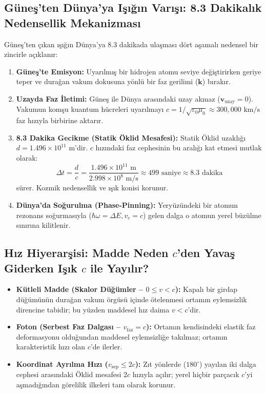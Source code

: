 \subsection{Güneş'ten Dünya'ya Işığın Varışı: 8.3 Dakikalık Nedensellik Mekanizması}
\label{sec:kavramsal_netlik_main}

Güneş'ten çıkan ışığın Dünya'ya 8.3 dakikada ulaşması dört aşamalı nedensel bir zincirle açıklanır:
\begin{enumerate}
    \item \textbf{Güneş'te Emisyon:} Uyarılmış bir hidrojen atomu seviye değiştirirken geriye teper ve durağan vakum dokusuna yönlü bir faz gerilimi ($\mathbf{k}$) bırakır.
    \item \textbf{Uzayda Faz İletimi:} Güneş ile Dünya arasındaki uzay akmaz ($\mathbf{v}_{\mathrm{uzay}} = 0$). Vakumun komşu kuantum hücreleri uyarılmayı $c = 1/\sqrt{\varepsilon_0\mu_0} \approx 300{,}000\text{ km/s}$ faz hızıyla birbirine aktarır.
    \item \textbf{8.3 Dakika Gecikme (Statik Öklid Mesafesi):} Statik Öklid uzaklığı $d = 1.496 \times 10^{11}\text{ m}$'dir. $c$ hızındaki faz cephesinin bu aralığı kat etmesi mutlak olarak:
          \begin{equation}
              \Delta t = \frac{d}{c} = \frac{1.496 \times 10^{11}\text{ m}}{2.998 \times 10^8\text{ m/s}} \approx 499\text{ saniye} \approx 8.3\text{ dakika}
          \end{equation}
          sürer. Kozmik nedensellik ve ışık konisi korunur.
    \item \textbf{Dünya'da Soğurulma (Phase-Pinning):} Yeryüzündeki bir atomun rezonans soğurmasıyla ($\hbar\omega = \Delta E, v_c = c$) gelen dalga o atomun yerel büzülme sınırına kilitlenir.
\end{enumerate}

\subsection{Hız Hiyerarşisi: Madde Neden \texorpdfstring{$c$}{c}'den Yavaş Giderken Işık \texorpdfstring{$c$}{c} ile Yayılır?}
\label{sec:hiz_hiyerarsisi_cozum}

\begin{itemize}
    \item \textbf{Kütleli Madde (Skalor Düğümler -- $0 \le v < c$):} Kapalı bir girdap düğümünün durağan vakum örgüsü içinde ötelenmesi ortamın eylemsizlik direncine tabidir; bu yüzden maddesel hız daima $v < c$'dir.
    \item \textbf{Foton (Serbest Faz Dalgası -- $v_{\mathrm{faz}} = c$):} Ortamın kendisindeki elastik faz deformasyonu olduğundan maddesel eylemsizliğe takılmaz; ortamın karakteristik hızı olan $c$'de ilerler.
    \item \textbf{Koordinat Ayrılma Hızı ($v_{\mathrm{sep}} \le 2c$):} Zıt yönlerde ($180^\circ$) yayılan iki dalga cephesi arasındaki Öklid mesafesi $2c$ hızıyla açılır; yerel hiçbir parçacık $c$'yi aşmadığından görelilik ilkeleri tam olarak korunur.
\end{itemize}

